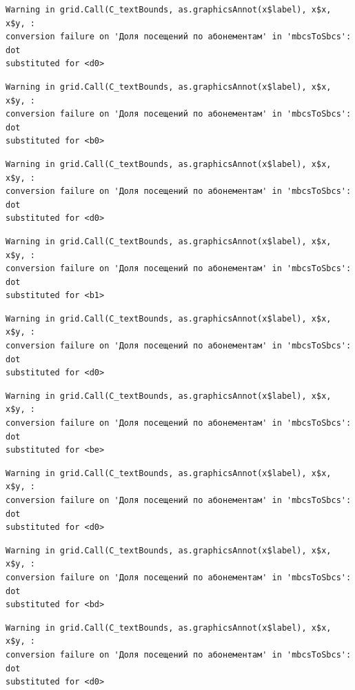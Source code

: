 \documentclass[
  letterpaper,
  DIV=11,
  numbers=noendperiod]{scrartcl}
\begin{document}
\begin{verbatim}
Warning in grid.Call(C_textBounds, as.graphicsAnnot(x$label), x$x, x$y, :
conversion failure on 'Доля посещений по абонементам' in 'mbcsToSbcs': dot
substituted for <d0>
\end{verbatim}

\begin{verbatim}
Warning in grid.Call(C_textBounds, as.graphicsAnnot(x$label), x$x, x$y, :
conversion failure on 'Доля посещений по абонементам' in 'mbcsToSbcs': dot
substituted for <b0>
\end{verbatim}

\begin{verbatim}
Warning in grid.Call(C_textBounds, as.graphicsAnnot(x$label), x$x, x$y, :
conversion failure on 'Доля посещений по абонементам' in 'mbcsToSbcs': dot
substituted for <d0>
\end{verbatim}

\begin{verbatim}
Warning in grid.Call(C_textBounds, as.graphicsAnnot(x$label), x$x, x$y, :
conversion failure on 'Доля посещений по абонементам' in 'mbcsToSbcs': dot
substituted for <b1>
\end{verbatim}

\begin{verbatim}
Warning in grid.Call(C_textBounds, as.graphicsAnnot(x$label), x$x, x$y, :
conversion failure on 'Доля посещений по абонементам' in 'mbcsToSbcs': dot
substituted for <d0>
\end{verbatim}

\begin{verbatim}
Warning in grid.Call(C_textBounds, as.graphicsAnnot(x$label), x$x, x$y, :
conversion failure on 'Доля посещений по абонементам' in 'mbcsToSbcs': dot
substituted for <be>
\end{verbatim}

\begin{verbatim}
Warning in grid.Call(C_textBounds, as.graphicsAnnot(x$label), x$x, x$y, :
conversion failure on 'Доля посещений по абонементам' in 'mbcsToSbcs': dot
substituted for <d0>
\end{verbatim}

\begin{verbatim}
Warning in grid.Call(C_textBounds, as.graphicsAnnot(x$label), x$x, x$y, :
conversion failure on 'Доля посещений по абонементам' in 'mbcsToSbcs': dot
substituted for <bd>
\end{verbatim}

\begin{verbatim}
Warning in grid.Call(C_textBounds, as.graphicsAnnot(x$label), x$x, x$y, :
conversion failure on 'Доля посещений по абонементам' in 'mbcsToSbcs': dot
substituted for <d0>
\end{verbatim}
\end{document}

